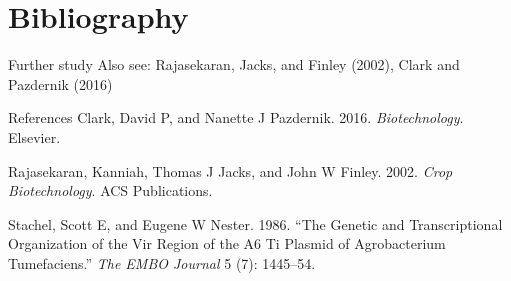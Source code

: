\documentclass[
  ignorenonframetext,
  aspectratio=169]{beamer}
\newlength{\cslhangindent}
\newenvironment{cslreferences}%
  {\setlength{\parindent}{0pt}%
  \everypar{\setlength{\hangindent}{\cslhangindent}}\ignorespaces}%
  {\par}
\begin{document}
\hypertarget{bibliography}{%
\section{Bibliography}\label{bibliography}}

\begin{frame}{Further study}
\protect\hypertarget{further-study}{}
Also see: Rajasekaran, Jacks, and Finley (2002), Clark and Pazdernik
(2016)
\end{frame}

\begin{frame}{References}
\protect\hypertarget{references}{}
\hypertarget{refs}{}
\begin{cslreferences}
\leavevmode\hypertarget{ref-clark2016biotechnology}{}%
Clark, David P, and Nanette J Pazdernik. 2016. \emph{Biotechnology}.
Elsevier.

\leavevmode\hypertarget{ref-rajasekaran2002crop}{}%
Rajasekaran, Kanniah, Thomas J Jacks, and John W Finley. 2002.
\emph{Crop Biotechnology}. ACS Publications.

\leavevmode\hypertarget{ref-stachel1986genetic}{}%
Stachel, Scott E, and Eugene W Nester. 1986. ``The Genetic and
Transcriptional Organization of the Vir Region of the A6 Ti Plasmid of
Agrobacterium Tumefaciens.'' \emph{The EMBO Journal} 5 (7): 1445--54.
\end{cslreferences}
\end{frame}
\end{document}

